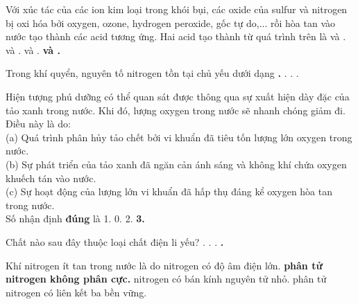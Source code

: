 \documentclass[11pt,a4paper]{article}
\begin{document}
\begin{ex}
Với xúc tác của các ion kim loại trong khói bụi, các oxide của sulfur và nitrogen bị oxi hóa bởi oxygen, ozone, hydrogen peroxide, gốc tự do,... rồi hòa tan vào nước tạo thành các acid tương ứng. Hai acid tạo thành từ quá trình trên là
\choice
{ và .}
{ và .}
{ và .}
{\textbf{\color{hfRed} và .}}
\end{ex}
\begin{ex}
Trong khí quyển, nguyên tố nitrogen tồn tại chủ yếu dưới dạng
\choice
{\textbf{\color{hfRed}.}}
{.}
{.}
{.}
\end{ex}
\begin{ex}
Hiện tượng phú dưỡng có thể quan sát được thông qua sự xuất hiện dày đặc của tảo xanh trong nước. Khi đó, lượng oxygen trong nước sẽ nhanh chóng giảm đi. Điều này là do:\\(a) Quá trình phân hủy tảo chết bởi vi khuẩn đã tiêu tốn lượng lớn oxygen trong nước.\\(b) Sự phát triển của tảo xanh đã ngăn cản ánh sáng và không khí chứa oxygen khuếch tán vào nước.\\(c) Sự hoạt động của lượng lớn vi khuẩn đã hấp thụ đáng kể oxygen hòa tan trong nước.\\Số nhận định \textbf{đúng} là
\choice
{1.}
{0.}
{2.}
{\textbf{\color{hfRed}3.}}
\end{ex}
\begin{ex}
Chất nào sau đây thuộc loại chất điện li yếu?
\choice
{.}
{.}
{.}
{\textbf{\color{hfRed}.}}
\end{ex}
\begin{ex}
Khí nitrogen ít tan trong nước là do
\choice
{nitrogen có độ âm điện lớn.}
{\textbf{\color{hfRed}phân tử nitrogen không phân cực.}}
{nitrogen có bán kính nguyên tử nhỏ.}
{phân tử nitrogen có liên kết ba bền vững.}
\end{ex}
\end{document}
